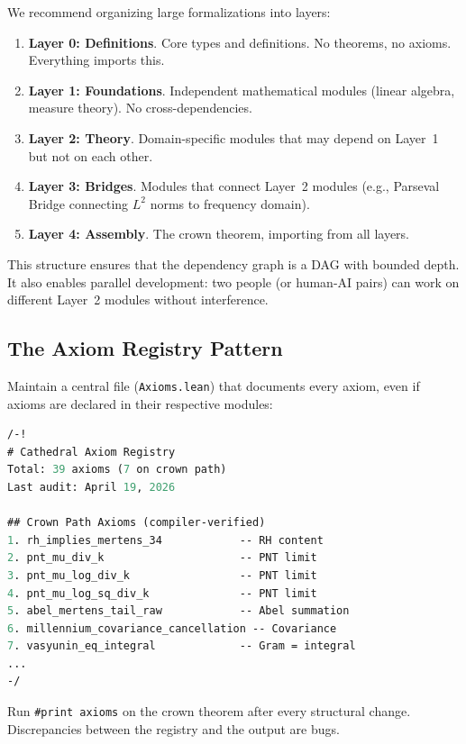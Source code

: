 \documentclass[11pt,a4paper]{article}
\newcommand{\lean}[1]{\texttt{#1}}
\begin{document}
We recommend organizing large formalizations into layers:

\begin{enumerate}
  \item \textbf{Layer 0: Definitions}. Core types and definitions.
    No theorems, no axioms. Everything imports this.
  \item \textbf{Layer 1: Foundations}. Independent mathematical
    modules (linear algebra, measure theory). No cross-dependencies.
  \item \textbf{Layer 2: Theory}. Domain-specific modules that may
    depend on Layer~1 but not on each other.
  \item \textbf{Layer 3: Bridges}. Modules that connect Layer~2
    modules (e.g., Parseval Bridge connecting $L^2$ norms to
    frequency domain).
  \item \textbf{Layer 4: Assembly}. The crown theorem, importing
    from all layers.
\end{enumerate}

This structure ensures that the dependency graph is a DAG with
bounded depth. It also enables parallel development: two people
(or human-AI pairs) can work on different Layer~2 modules without
interference.

\subsection{The Axiom Registry Pattern}

Maintain a central file (\lean{Axioms.lean}) that documents every
axiom, even if axioms are declared in their respective modules:

\begin{lstlisting}[language=ML,caption={Axiom registry pattern}]
/-!
# Cathedral Axiom Registry
Total: 39 axioms (7 on crown path)
Last audit: April 19, 2026

## Crown Path Axioms (compiler-verified)
1. rh_implies_mertens_34            -- RH content
2. pnt_mu_div_k                     -- PNT limit
3. pnt_mu_log_div_k                 -- PNT limit
4. pnt_mu_log_sq_div_k              -- PNT limit
5. abel_mertens_tail_raw            -- Abel summation
6. millennium_covariance_cancellation -- Covariance
7. vasyunin_eq_integral             -- Gram = integral
...
-/
\end{lstlisting}

Run \lean{\#print axioms} on the crown theorem after every
structural change. Discrepancies between the registry and the
output are bugs.
\end{document}
